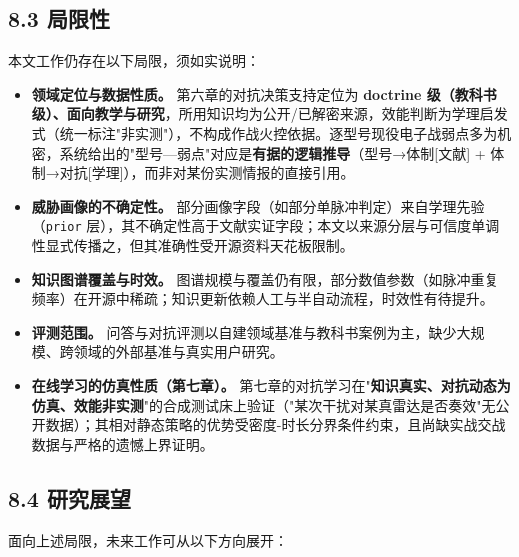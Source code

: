 \documentclass[12pt,a4paper]{ctexart}
\begin{document}
\subsection*{8.3 局限性}

本文工作仍存在以下局限，须如实说明：

\begin{itemize}[leftmargin=2em]
\item \textbf{领域定位与数据性质。} 第六章的对抗决策支持定位为 \textbf{doctrine 级（教科书级）、面向教学与研究}，所用知识均为公开/已解密来源，效能判断为学理启发式（统一标注"非实测"），不构成作战火控依据。逐型号现役电子战弱点多为机密，系统给出的"型号—弱点"对应是\textbf{有据的逻辑推导}（型号→体制[文献] + 体制→对抗[学理]），而非对某份实测情报的直接引用。
\item \textbf{威胁画像的不确定性。} 部分画像字段（如部分单脉冲判定）来自学理先验（\texttt{prior} 层），其不确定性高于文献实证字段；本文以来源分层与可信度单调性显式传播之，但其准确性受开源资料天花板限制。
\item \textbf{知识图谱覆盖与时效。} 图谱规模与覆盖仍有限，部分数值参数（如脉冲重复频率）在开源中稀疏；知识更新依赖人工与半自动流程，时效性有待提升。
\item \textbf{评测范围。} 问答与对抗评测以自建领域基准与教科书案例为主，缺少大规模、跨领域的外部基准与真实用户研究。
\item \textbf{在线学习的仿真性质（第七章）。} 第七章的对抗学习在"\textbf{知识真实、对抗动态为仿真、效能非实测}"的合成测试床上验证（"某次干扰对某真雷达是否奏效"无公开数据）；其相对静态策略的优势受密度-时长分界条件约束，且尚缺实战交战数据与严格的遗憾上界证明。
\end{itemize}

\subsection*{8.4 研究展望}

面向上述局限，未来工作可从以下方向展开：
\end{document}
